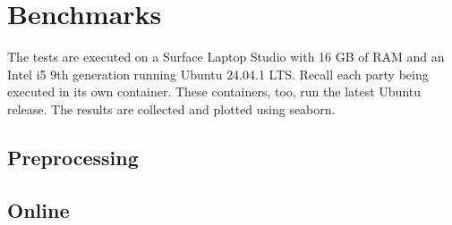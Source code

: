 \section{Benchmarks}\label{sub:expEvalBenchmarks}
The tests are executed on a Surface Laptop Studio with 16 GB of RAM and an Intel i5 9th generation running Ubuntu 24.04.1 LTS.
Recall each party being executed in its own container.
These containers, too, run the latest Ubuntu release.
The results are collected and plotted using seaborn.

\subsection{Preprocessing}


\subsection{Online}
